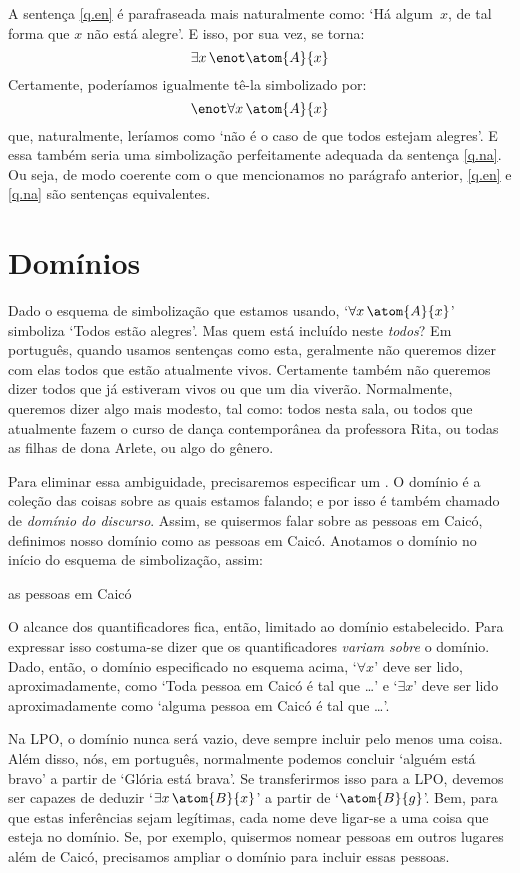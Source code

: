 A sentença \ref{q.en} é parafraseada mais naturalmente como:
`Há algum~$x$, de tal forma que $x$ não está alegre'.
E isso, por sua vez, se torna:
$$\exists x\, \enot \atom{A}{x}$$
Certamente, poderíamos igualmente tê-la simbolizado por:
$$\enot\forall x\,\atom{A}{x}$$
que, naturalmente, leríamos como `não é o caso de que todos estejam alegres'.
E essa também seria uma simbolização perfeitamente adequada da sentença \ref{q.na}.
Ou seja, de modo coerente com o que mencionamos no parágrafo anterior, \ref{q.en} e \ref{q.na} são sentenças equivalentes.


\section{Domínios}
Dado o esquema de simbolização que estamos usando, `$\forall x\,\atom{A}{x}$' simboliza `Todos estão alegres'.
Mas quem está incluído neste \emph{todos}?
Em português, quando usamos sentenças como esta, geralmente não queremos dizer com elas todos que estão atualmente vivos.
Certamente também não queremos dizer todos que já estiveram vivos ou que um dia viverão.
Normalmente, queremos dizer algo mais modesto, tal como:
todos nesta sala, ou todos que atualmente fazem o curso de dança contemporânea da professora Rita, ou todas as filhas de dona Arlete, ou algo do gênero.

Para eliminar essa ambiguidade, precisaremos especificar um .
O domínio é a coleção das coisas sobre as quais estamos falando; e por isso é também chamado de \emph{domínio do discurso}.
Assim, se quisermos falar sobre as pessoas em Caicó, definimos nosso domínio como as pessoas em Caicó.
Anotamos o domínio no início do esquema de simbolização, assim:
\begin{center}
	\begin{ekey}
		\item[\text{domínio}] as pessoas em Caicó
	\end{ekey}
\end{center}
O alcance dos quantificadores fica, então, limitado ao domínio estabelecido.
Para expressar isso costuma-se dizer que os quantificadores \emph{variam sobre} o domínio.
Dado, então, o domínio especificado no esquema acima, `$\forall x$' deve ser lido, aproximadamente, como  `Toda pessoa em Caicó é tal que \ldots' e `$\exists x $' deve ser lido aproximadamente como `alguma pessoa em Caicó é tal que \ldots'. 

Na LPO, o domínio nunca será vazio, deve sempre incluir pelo menos uma coisa. Além disso, nós, em português, normalmente podemos concluir `alguém está bravo' a partir de `Glória está brava'.
Se transferirmos isso para a LPO, devemos ser capazes de deduzir `$\exists x\, \atom{B}{x}$' a partir de `$\atom{B}{g}$'.
Bem, para que estas inferências sejam legítimas, cada nome deve ligar-se a uma coisa que esteja no domínio.
Se, por exemplo, quisermos nomear pessoas em outros lugares além de Caicó, precisamos ampliar o domínio para incluir essas pessoas. 

